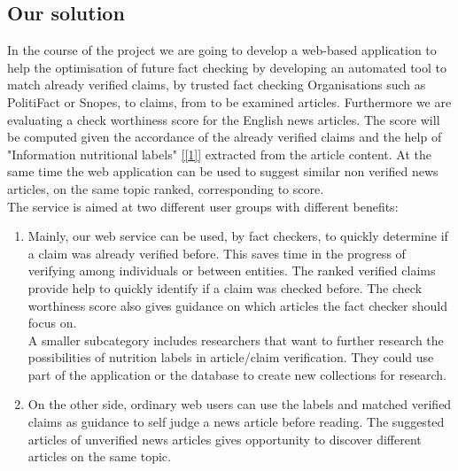 \documentclass[10pt]{article}
\begin{document}
\subsection{Our solution}
In the course of the project we are going to develop a web-based application to help the optimisation of future fact checking by developing an automated tool to match already verified claims, by trusted fact checking Organisations such as PolitiFact or Snopes, to claims, from to be examined articles.
Furthermore we are evaluating a check worthiness score for the English news articles.
The score will be computed given the accordance of the already verified claims and the help of "Information nutritional labels" \ref{[1]} extracted from the article content.
At the same time the web application can be used to suggest similar non verified news articles, on the same topic ranked, corresponding to score.\\
The service is aimed at two different user groups with different benefits:
\begin{enumerate}
\item Mainly, our web service can be used, by fact checkers, to quickly determine if a claim was already verified before.
This saves time in the progress of verifying among individuals or between entities.
The ranked verified claims provide help to quickly identify if a claim was checked before.
The check worthiness score also gives guidance on which articles the fact checker should focus on.\\
A smaller subcategory includes researchers that want to further research the possibilities of nutrition labels in article/claim verification.
They could use part of the application or the database to create new collections for research.\\
\item On the other side, ordinary web users can use the labels and matched verified claims as guidance to self judge a news article before reading. The suggested articles of unverified news articles gives opportunity to discover different articles on the same topic.
\end{enumerate}

\end{document}

